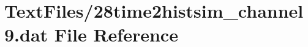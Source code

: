 \hypertarget{28time2histsim__channel9_8dat}{}\section{Text\+Files/28time2histsim\+\_\+channel9.dat File Reference}
\label{28time2histsim__channel9_8dat}
